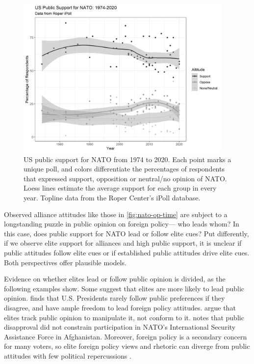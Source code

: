 \documentclass[12pt]{article}
\begin{document}
\begin{figure}
	\centering
		\includegraphics[width=0.95\textwidth]{../figures/nato-op-time.png}
	\caption{US public support for NATO from 1974 to 2020. Each point marks a unique poll, and colors differentiate the percentages of respondents that expressed support, opposition or neutral/no opinion of NATO. Loess lines estimate the average support for each group in every year. Topline data from the Roper Center's iPoll database.}
	\label{fig:nato-op-time}
\end{figure}



Observed alliance attitudes like those in \autoref{fig:nato-op-time} are subject to a longstanding puzzle in public opinion on foreign policy--- who leads whom? 
In this case, does public support for NATO lead or follow elite cues? 
Put differently, if we observe elite support for alliances and high public support, it is unclear if public attitudes follow elite cues or if established public attitudes drive elite cues. 
Both perspectives offer plausible models. 


Evidence on whether elites lead or follow public opinion is divided, as the following examples show.
Some suggest that elites are more likely to lead public opinion. 
\citet{Canes-Wrone2006} finds that U.S. Presidents rarely follow public preferences if they disagree, and have ample freedom to lead foreign policy attitudes. 
\citet{JacobsShapiro2000} argue that elites track public opinion to manipulate it, not conform to it. 
\citet{Kreps2010} notes that public disapproval did not constrain participation in NATO's International Security Assistance Force in Afghanistan. 
Moreover, foreign policy is a secondary concern for many voters, so elite foreign policy views and rhetoric can diverge from public attitudes with few political repercussions \citep{BusbyMonten2012}. 
\end{document}
